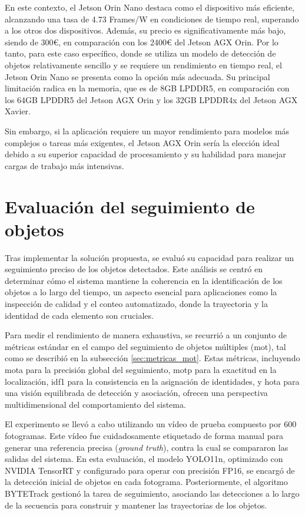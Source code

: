 \documentclass[11pt,spanish,listoffigures,listoftables]{tfgetsinf}
\begin{document}
En este contexto, el Jetson Orin Nano destaca como el dispositivo más eficiente, alcanzando una tasa de 4.73 Frames/W en condiciones de tiempo real, superando a los otros dos dispositivos. Además, su precio es significativamente más bajo, siendo de 300€, en comparación con los 2400€ del Jetson AGX Orin. Por lo tanto, para este caso específico, donde se utiliza un modelo de detección de objetos relativamente sencillo y se requiere un rendimiento en tiempo real, el Jetson Orin Nano se presenta como la opción más adecuada. Su principal limitación radica en la memoria, que es de 8GB LPDDR5, en comparación con los 64GB LPDDR5 del Jetson AGX Orin y los 32GB LPDDR4x del Jetson AGX Xavier.

Sin embargo, si la aplicación requiere un mayor rendimiento para modelos más complejos o tareas más exigentes, el Jetson AGX Orin sería la elección ideal debido a su superior capacidad de procesamiento y su habilidad para manejar cargas de trabajo más intensivas.


\section{Evaluación del seguimiento de objetos} \label{sub:evaluacion_seguimiento_objetos}
Tras implementar la solución propuesta, se evaluó su capacidad para realizar un seguimiento preciso de los objetos detectados. Este análisis se centró en determinar cómo el sistema mantiene la coherencia en la identificación de los objetos a lo largo del tiempo, un aspecto esencial para aplicaciones como la inspección de calidad y el conteo automatizado, donde la trayectoria y la identidad de cada elemento son cruciales.

Para medir el rendimiento de manera exhaustiva, se recurrió a un conjunto de métricas estándar en el campo del seguimiento de objetos múltiples (\gls{mot}), tal como se describió en la subsección \ref{sec:metricas_mot}. Estas métricas, incluyendo \gls{mota} para la precisión global del seguimiento, \gls{motp} para la exactitud en la localización, \gls{idf1} para la consistencia en la asignación de identidades, y \gls{hota} para una visión equilibrada de detección y asociación, ofrecen una perspectiva multidimensional del comportamiento del sistema.

El experimento se llevó a cabo utilizando un vídeo de prueba compuesto por 600 fotogramas. Este vídeo fue cuidadosamente etiquetado de forma manual para generar una referencia precisa (\textit{ground truth}), contra la cual se compararon las salidas del sistema. En esta evaluación, el modelo YOLO11n, optimizado con NVIDIA TensorRT y configurado para operar con precisión FP16, se encargó de la detección inicial de objetos en cada fotograma. Posteriormente, el algoritmo BYTETrack\cite{zhang2022bytetrackmultiobjecttrackingassociating} gestionó la tarea de seguimiento, asociando las detecciones a lo largo de la secuencia para construir y mantener las trayectorias de los objetos.
\end{document}
